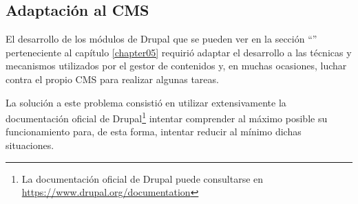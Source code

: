 	\subsection{Adaptación al CMS}
	\label{implementacion:adaptacion_cms}
	
		El desarrollo de los módulos de Drupal que se pueden ver en la sección ``'' perteneciente al capítulo \ref{chapter05} requirió adaptar el desarrollo a las técnicas y mecanismos utilizados por el gestor de contenidos y, en muchas ocasiones, luchar contra el propio CMS para realizar algunas tareas.
		
		La solución a este problema consistió en utilizar extensivamente la documentación oficial de Drupal\footnote{La documentación oficial de Drupal puede consultarse en \url{https://www.drupal.org/documentation}} intentar comprender al máximo posible su funcionamiento para, de esta forma, intentar reducir al mínimo dichas situaciones.

